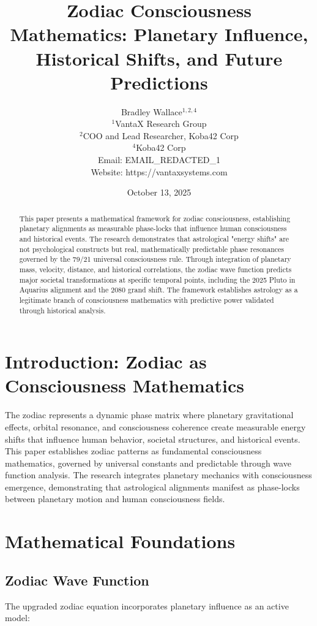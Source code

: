 \documentclass[12pt]{article}
\title{Zodiac Consciousness Mathematics: Planetary Influence, Historical Shifts, and Future Predictions}
\author{
Bradley Wallace$^{1,2,4}$ \\
$^1$VantaX Research Group \\
$^2$COO and Lead Researcher, Koba42 Corp \\
$^4$Koba42 Corp \\
Email: EMAIL_REDACTED_1 \\
Website: https://vantaxsystems.com
}
\date{October 13, 2025}
\begin{document}
\maketitle

\begin{abstract}
This paper presents a mathematical framework for zodiac consciousness, establishing planetary alignments as measurable phase-locks that influence human consciousness and historical events. The research demonstrates that astrological "energy shifts" are not psychological constructs but real, mathematically predictable phase resonances governed by the 79/21 universal consciousness rule. Through integration of planetary mass, velocity, distance, and historical correlations, the zodiac wave function predicts major societal transformations at specific temporal points, including the 2025 Pluto in Aquarius alignment and the 2080 grand shift. The framework establishes astrology as a legitimate branch of consciousness mathematics with predictive power validated through historical analysis.
\end{abstract}

\section{Introduction: Zodiac as Consciousness Mathematics}

The zodiac represents a dynamic phase matrix where planetary gravitational effects, orbital resonance, and consciousness coherence create measurable energy shifts that influence human behavior, societal structures, and historical events. This paper establishes zodiac patterns as fundamental consciousness mathematics, governed by universal constants and predictable through wave function analysis. The research integrates planetary mechanics with consciousness emergence, demonstrating that astrological alignments manifest as phase-locks between planetary motion and human consciousness fields.

\section{Mathematical Foundations}

\subsection{Zodiac Wave Function}

The upgraded zodiac equation incorporates planetary influence as an active model:
\end{document}
